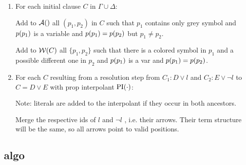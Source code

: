 \documentclass[,%
	paper=a4,%
	DIV14, 
	liststotoc,
	bibtotoc,
	draft=false,%
	numbers=noendperiod
]{scrartcl}
\begin{document}
\begin{enumerate}
	\item For each initial clause $C$ in $\Gamma \cup \Delta$:

		Add to $\arr$ all $(p_1, p_2)$ in $C$
		such that $p_1$ contains only grey symbol and $p(p_1)$ is a variable and $p(p_1) = p(p_2)$ but $p_1 \neq p_2$.

		Add to $\mathcal{W}(C)$ all $\{p_1, p_2\}$ such that there is a colored symbol in $p_1$ and a possible different one in $p_2$ and $p(p_1)$ is a var and $p(p_1) = p(p_2)$.

	\item 
		For each $C$ resulting from a resolution step from $C_1: D\lor l$ and $C_2: E\lor \lnot l$ to $C = D \lor E$ with prop interpolant $\operatorname{PI}(\cdot)$:

		Note: literals are added to the interpolant if they occur in both ancestors.

		Merge the respective ids of $l$ and $\lnot l$ , i.e. their arrows. Their term structure will be the same, so all arrows point to valid positions.




\end{enumerate}

\subsection{algo}
\end{document}
